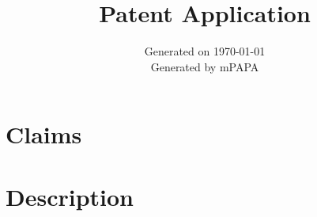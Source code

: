 \documentclass[a4paper,11pt]{article}
\title{\textbf{Patent Application}}
\author{}
\date{Generated on \today\\[0.5em]\small Generated by mPAPA}
\begin{document}
\maketitle
\tableofcontents
\newpage

\section{Claims}

\section{Description}



\printbibliography
\end{document}

